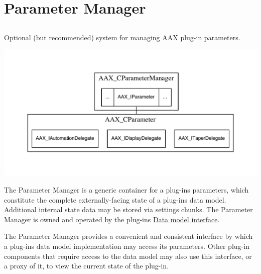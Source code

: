 \hypertarget{a00344}{}\section{Parameter Manager}
\label{a00344}


\subsection{ }
Optional (but recommended) system for managing A\+A\+X plug-\/in parameters. 


\begin{DoxyImageNoCaption}
  \mbox{\includegraphics[width=\textwidth,height=\textheight/2,keepaspectratio=true]{dot_aax_cparammgr_contained}}
\end{DoxyImageNoCaption}


The Parameter Manager is a generic container for a plug-\/in\textquotesingle{}s parameters, which constitute the complete externally-\/facing state of a plug-\/in\textquotesingle{}s data model. Additional internal state data may be stored via settings chunks. The Parameter Manager is owned and operated by the plug-\/in\textquotesingle{}s \hyperlink{a00328}{Data model interface}.

The Parameter Manager provides a convenient and consistent interface by which a plug-\/in\textquotesingle{}s data model implementation may access its parameters. Other plug-\/in components that require access to the data model may also use this interface, or a proxy of it, to view the current state of the plug-\/in.

